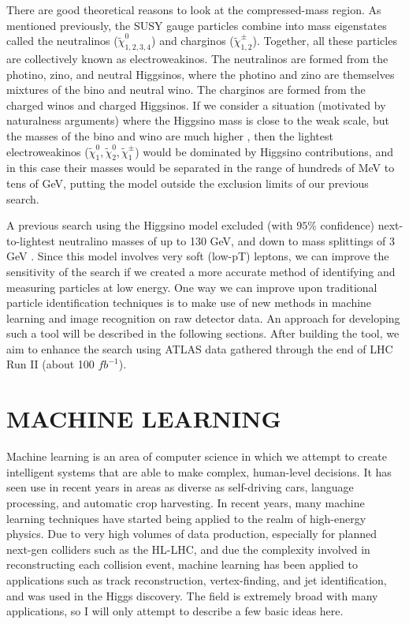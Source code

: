 \documentclass{article}
\begin{document}
There are good theoretical reasons to look at the compressed-mass region. As mentioned previously, the SUSY gauge particles combine into mass eigenstates called the neutralinos ($\tilde{\chi}^0_{1,2,3,4}$) and charginos ($\tilde{\chi}^\pm_{1,2}$). Together, all these particles are collectively known as electroweakinos. The neutralinos are formed from the photino, zino, and neutral Higgsinos, where the photino and zino are themselves mixtures of the bino and neutral wino. The charginos are formed from the charged winos and charged Higgsinos. If we consider a situation (motivated by naturalness arguments) where the Higgsino mass is close to the weak scale, but the masses of the bino and wino are much higher \cite{Higgsino}, then the lightest electroweakinos ($\tilde{\chi}^0_1, \tilde{\chi}^0_2, \tilde{\chi}^\pm_1$) would be dominated by Higgsino contributions, and in this case their masses would be separated in the range of hundreds of MeV to tens of GeV, putting the model outside the exclusion limits of our previous search.

A previous search using the Higgsino model excluded (with $95\%$ confidence) next-to-lightest neutralino masses of up to 130 GeV, and down to mass splittings of 3 GeV \cite{Higgsino}. Since this model involves very soft (low-pT) leptons, we can improve the sensitivity of the search if we created a more accurate method of identifying and measuring particles at low energy. One way we can improve upon traditional particle identification techniques is to make use of new methods in machine learning and image recognition on raw detector data. An approach for developing such a tool will be described in the following sections. After building the tool, we aim to enhance the search using ATLAS data gathered through the end of LHC Run II (about 100 $fb^{-1}$).

\section*{MACHINE LEARNING}

Machine learning is an area of computer science in which we attempt to create intelligent systems that are able to make complex, human-level decisions. It has seen use in recent years in areas as diverse as self-driving cars, language processing, and automatic crop harvesting. In recent years, many machine learning techniques have started being applied to the realm of high-energy physics. Due to very high volumes of data production, especially for planned next-gen colliders such as the HL-LHC, and due the complexity involved in reconstructing each collision event, machine learning has been applied to applications such as track reconstruction, vertex-finding, and jet identification, and was used in the Higgs discovery. The field is extremely broad with many applications, so I will only attempt to describe a few basic ideas here.
\end{document}
